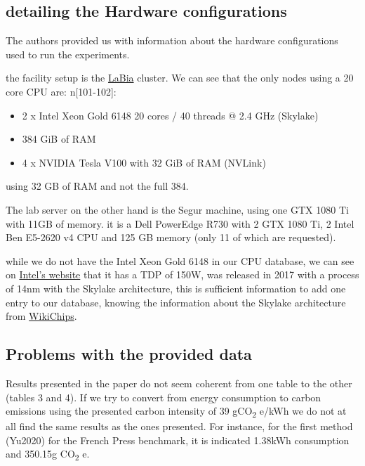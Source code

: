 \documentclass[11pt]{article}
\begin{document}
\subsection{detailing the Hardware configurations}
\label{sec:org36bd262}
The authors provided us with information about the hardware
configurations used to run  the experiments. 

the facility setup is the \href{https://doc.lab-ia.fr/}{LaBia} cluster. We can see that the only nodes using a
20 core CPU are: n[101-102]:

\begin{itemize}
\item 2 x Intel Xeon Gold 6148 20 cores / 40 threads @ 2.4 GHz (Skylake)
\item 384 GiB of RAM
\item 4 x NVIDIA Tesla V100 with 32 GiB of RAM (NVLink)
\end{itemize}

using 32 GB of RAM and not the full 384.

The lab server on the other hand is the Segur machine, using one GTX 1080 Ti with 11GB of memory.
it is a Dell PowerEdge R730 with 2 GTX 1080 Ti, 2 Intel Ben E5-2620
v4 CPU and 125 GB memory (only 11 of which are requested).

while we do not have the Intel Xeon Gold 6148 in our CPU database, we
can see on \href{https://www.intel.fr/content/www/fr/fr/products/sku/120489/intel-xeon-gold-6148-processor-27-5m-cache-2-40-ghz/specifications.html}{Intel's website} that it has a \gls{TDP} of 150W, was released in
2017 with a process of 14nm with the Skylake architecture, this is
sufficient information to add one entry to our database, knowing the
information about the Skylake architecture from \href{https://en.wikichip.org/wiki/intel/microarchitectures/skylake\_(server)}{WikiChips}. 

\subsection{Problems with the provided data}
\label{sec:orgc674b7a}

Results presented in the paper do not seem coherent from one table to
the other (tables 3 and 4). If we try to convert from energy consumption to carbon
emissions using the presented carbon intensity of 39 gCO\textsubscript{2} e/kWh we do
not at all find the same results as the ones presented.
For instance, for the first method (Yu2020) for the French Press
benchmark, it is indicated 1.38kWh consumption and 350.15g CO\textsubscript{2} e.
\end{document}
